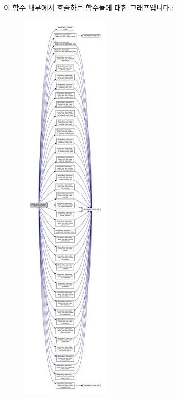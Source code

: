 이 함수 내부에서 호출하는 함수들에 대한 그래프입니다.\+:
\nopagebreak
\begin{figure}[H]
\begin{center}
\leavevmode
\includegraphics[height=550pt]{group__descriptor__audio_ga378aaf48d5f066011436e23c2bf4d455_cgraph}
\end{center}
\end{figure}


